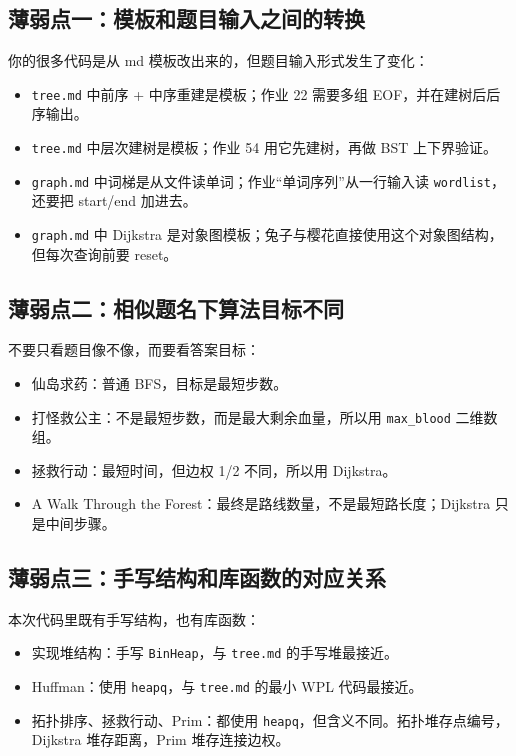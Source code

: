 \documentclass[10pt,a4paper,fontset=none]{ctexart}
\begin{document}
\subsection{薄弱点一：模板和题目输入之间的转换}
你的很多代码是从 md 模板改出来的，但题目输入形式发生了变化：
\begin{itemize}
  \item \texttt{tree.md} 中前序 + 中序重建是模板；作业 22 需要多组 EOF，并在建树后后序输出。
  \item \texttt{tree.md} 中层次建树是模板；作业 54 用它先建树，再做 BST 上下界验证。
  \item \texttt{graph.md} 中词梯是从文件读单词；作业“单词序列”从一行输入读 \texttt{wordlist}，还要把 start/end 加进去。
  \item \texttt{graph.md} 中 Dijkstra 是对象图模板；兔子与樱花直接使用这个对象图结构，但每次查询前要 reset。
\end{itemize}

\subsection{薄弱点二：相似题名下算法目标不同}
不要只看题目像不像，而要看答案目标：
\begin{itemize}
  \item 仙岛求药：普通 BFS，目标是最短步数。
  \item 打怪救公主：不是最短步数，而是最大剩余血量，所以用 \texttt{max\_blood} 二维数组。
  \item 拯救行动：最短时间，但边权 1/2 不同，所以用 Dijkstra。
  \item A Walk Through the Forest：最终是路线数量，不是最短路长度；Dijkstra 只是中间步骤。
\end{itemize}

\subsection{薄弱点三：手写结构和库函数的对应关系}
本次代码里既有手写结构，也有库函数：
\begin{itemize}
  \item 实现堆结构：手写 \texttt{BinHeap}，与 \texttt{tree.md} 的手写堆最接近。
  \item Huffman：使用 \texttt{heapq}，与 \texttt{tree.md} 的最小 WPL 代码最接近。
  \item 拓扑排序、拯救行动、Prim：都使用 \texttt{heapq}，但含义不同。拓扑堆存点编号，Dijkstra 堆存距离，Prim 堆存连接边权。
\end{itemize}
\end{document}
